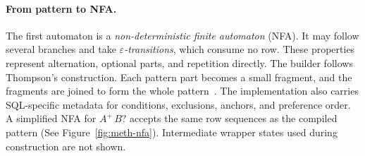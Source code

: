 \paragraph{From pattern to NFA.}
The first automaton is a \emph{non-deterministic finite automaton}
(NFA).  It may follow several branches and take
\emph{$\varepsilon$-transitions}, which consume no row.  These
properties represent alternation, optional parts, and repetition
directly.  The builder follows Thompson's construction.  Each pattern
part becomes a small fragment, and the fragments are joined to form the
whole pattern~\cite{Thompson1968,DragonBook}.  The implementation also
carries SQL-specific metadata for conditions, exclusions, anchors, and
preference order.  A simplified NFA for $A^{+}\,B?$ accepts the same row
sequences as the compiled pattern (See Figure~\ref{fig:meth-nfa}).
Intermediate wrapper states used during construction are not
shown.

